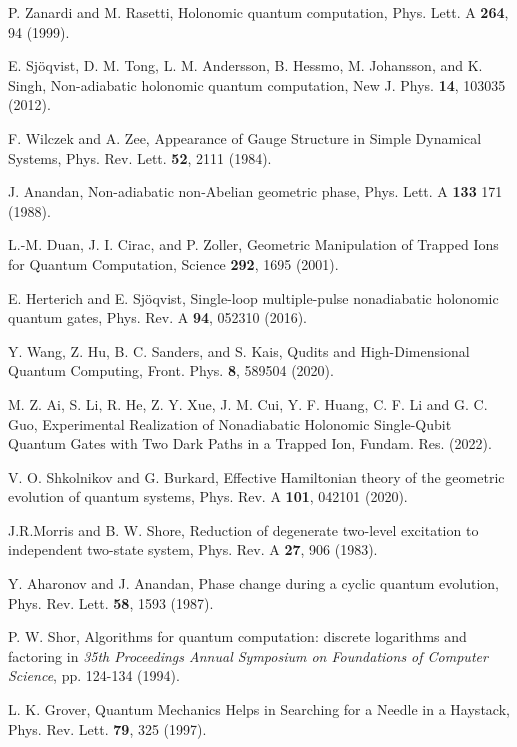 \documentclass[pra,showpacs,priprent,twocolumn,superscriptaddress]{revtex4-1}
\begin{document}
\begin{thebibliography}{99}
 P. Zanardi and M. Rasetti,  
Holonomic quantum computation, 
Phys. Lett. A {\bf 264}, 94 (1999). 

 E. Sj\"{o}qvist, D. M. Tong, L. M. Andersson, B. Hessmo, M. Johansson,
and K. Singh, 
Non-adiabatic holonomic quantum computation, 
New J. Phys. {\bf 14}, 103035 (2012).

 F. Wilczek and A. Zee, 
Appearance of Gauge Structure in Simple Dynamical Systems, 
Phys. Rev. Lett. {\bf 52}, 2111  (1984).

 J. Anandan, 
Non-adiabatic non-Abelian geometric phase, 
Phys. Lett. A {\bf 133} 171 (1988). 

 L.-M. Duan, J. I. Cirac, and P. Zoller, 
Geometric Manipulation of Trapped Ions for Quantum Computation, 
Science {\bf 292}, 1695 (2001). 

 E. Herterich and E. Sj\"oqvist,  
Single-loop multiple-pulse nonadiabatic holonomic quantum gates, 
Phys. Rev. A {\bf 94}, 052310 (2016). 

 Y. Wang, Z. Hu, B. C. Sanders, and S. Kais,  
Qudits and High-Dimensional Quantum Computing, 
Front. Phys. {\bf 8}, 589504 (2020). 

 M. Z. Ai, S. Li, R. He, Z. Y. Xue, J. M. Cui, Y. F. Huang, C. F. Li and G. C. Guo, 
Experimental Realization of Nonadiabatic Holonomic Single-Qubit Quantum Gates with 
Two Dark Paths in a Trapped Ion, 
Fundam. Res. (2022). 

 V. O. Shkolnikov and G. Burkard, 
Effective Hamiltonian theory of the geometric evolution of quantum systems, 
Phys. Rev. A {\bf 101}, 042101 (2020). 

 J.R.Morris and B. W. Shore, 
Reduction of degenerate two-level excitation to independent two-state system, 
Phys. Rev. A {\bf 27}, 906 (1983).

 Y. Aharonov and J. Anandan, 
Phase change during a cyclic quantum evolution, 
Phys. Rev. Lett. {\bf 58}, 1593 (1987). 

 P. W. Shor, Algorithms for quantum computation: discrete logarithms and factoring in \textit{35th Proceedings Annual Symposium on Foundations of Computer Science}, pp. 124-134 (1994).


 L. K. Grover, Quantum Mechanics Helps in Searching for a Needle in a Haystack, Phys. Rev. Lett. \textbf{79}, 325 (1997).


\end{thebibliography}
\end{document}
